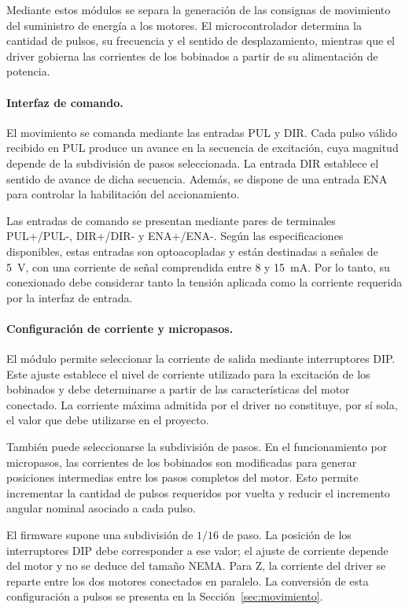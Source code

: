 \documentclass[blue,fullpaper]{ludusofficial}  %
\begin{document}
Mediante estos módulos se separa la generación
de las consignas de movimiento del suministro
de energía a los motores. El microcontrolador
determina la cantidad de pulsos, su frecuencia
y el sentido de desplazamiento, mientras que
el driver gobierna las corrientes de los
bobinados a partir de su alimentación de potencia.

\paragraph{Interfaz de comando.}

El movimiento se comanda mediante las entradas
PUL y DIR. Cada pulso válido recibido en PUL
produce un avance en la secuencia de excitación,
cuya magnitud depende de la subdivisión de pasos
seleccionada. La entrada DIR establece el sentido
de avance de dicha secuencia. Además, se dispone
de una entrada ENA para controlar la habilitación
del accionamiento.

Las entradas de comando se presentan mediante
pares de terminales PUL+/PUL-, DIR+/DIR- y
ENA+/ENA-. Según las especificaciones disponibles,
estas entradas son optoacopladas y están destinadas
a señales de 5~V, con una corriente de señal
comprendida entre 8 y 15~mA. Por lo tanto, su
conexionado debe considerar tanto la tensión
aplicada como la corriente requerida por
la interfaz de entrada.

\paragraph{Configuración de corriente y micropasos.}

El módulo permite seleccionar la corriente
de salida mediante interruptores DIP. Este ajuste
establece el nivel de corriente utilizado para
la excitación de los bobinados y debe determinarse
a partir de las características del motor conectado.
La corriente máxima admitida por el driver no
constituye, por sí sola, el valor que debe utilizarse
en el proyecto.

También puede seleccionarse la subdivisión
de pasos. En el funcionamiento por micropasos,
las corrientes de los bobinados son modificadas
para generar posiciones intermedias entre los
pasos completos del motor. Esto permite incrementar
la cantidad de pulsos requeridos por vuelta
y reducir el incremento angular nominal asociado
a cada pulso.

El firmware supone una subdivisión de $1/16$ de paso. La posición de los interruptores DIP debe corresponder a ese valor; el ajuste de corriente depende del motor y no se deduce del tamaño NEMA. Para Z, la corriente del driver se reparte entre los dos motores conectados en paralelo. La conversión de esta configuración a pulsos se presenta en la Sección~\ref{sec:movimiento}.
\end{document}
